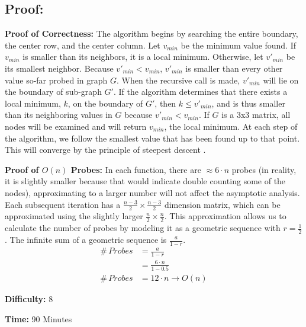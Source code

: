 \documentclass{article}
\begin{document}
\subsection*{Proof:}
\noindent \textbf{Proof of Correctness:}
The algorithm begins by searching the entire boundary, the center row, and the center column. 
Let $v_{min}$ be the minimum value found. If $v_{min}$ is smaller than its neighbors, it is a local minimum.
Otherwise, let $v'_{min}$ be its smallest neighbor.  Because $v'_{min} < v_{min}$, $v'_{min}$ is smaller than every other value so-far probed in graph $G$.
When the recursive call is made, $v'_{min}$ will lie on the boundary of sub-graph $G'$. 
\newline \noindent If the algorithm determines that there exists a local minimum, $k$, on the boundary of $G'$, then $k \leq v'_{min}$, and is thus smaller than its neighboring values in $G$ because $v'_{min} < v_{min}$.
\newline \noindent If $G$ is a 3x3 matrix, all nodes will be examined and will return $v_{min}$, the local minimum.  
\newline \noindent At each step of the algorithm, we follow the smallest value that has been found up to that point.  This will converge by the principle of steepest descent \cite{Matrix}.

\noindent \textbf{Proof of $O(n)$ Probes:}
In each function, there are $\approx 6 \cdot n$ probes (in reality, it is slightly smaller because that would indicate double counting some of the nodes), approximating to a larger number will not affect the asymptotic analysis.  Each subsequent iteration has a $\frac{n-3}{2} \times \frac{n-3}{2}$ dimension matrix, which can be approximated using the slightly larger $\frac{n}{2} \times \frac{n}{2}$.  This approximation allows us to calculate the number of probes by modeling it as a geometric sequence with $r = \frac{1}{2}$.
The infinite sum of a geometric sequence is $\frac{a}{1 - r}$.  
\begin{align*}
\# \,Probes &= \frac{a}{1- r} \\
 &= \frac{6 \cdot n}{1- 0.5} \\
\# \, Probes &= \boxed{ 12 \cdot n \rightarrow O(n) }
\end{align*}

\noindent \textbf{Difficulty:}  8

\noindent \textbf{Time:}  90 Minutes

%
\printbibliography
\end{document}
